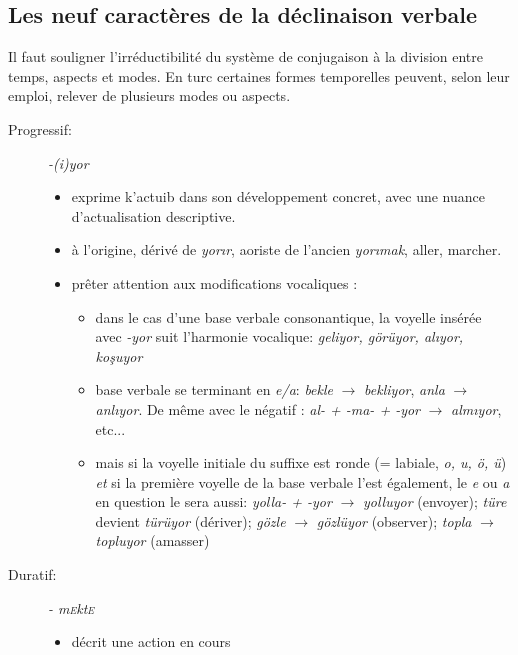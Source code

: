 \documentclass{cours}
\newcommand{\ch}{\c{s}}
\newcommand{\sce}{\textsc{e}}
\begin{document}
\subsection{Les neuf caractères de la déclinaison verbale}
Il faut souligner l'irréductibilité du système de conjugaison à la division entre temps, aspects et modes. En turc certaines formes temporelles peuvent, selon leur emploi, relever de plusieurs modes ou aspects.

\begin{description}
    \item[Progressif:] {\sl -(i)yor}
        \begin{itemize}
            \item exprime k'actuib dans son développement concret, avec une nuance d'actualisation descriptive.
            \item à l'origine, dérivé de \textsl{yor\i r}, aoriste de l'ancien \textsl{yor\i mak}, \og aller, marcher\fg.
            \item prêter attention aux modifications vocaliques :
                  \begin{itemize}[label = \textbullet]
                      \item dans le cas d'une base verbale consonantique, la voyelle insérée avec \textsl{-yor} suit l'harmonie vocalique: \textsl{geliyor, görüyor, al\i yor, ko\ch uyor}
                      \item base verbale se terminant en \textsl{e/a}: \textsl{bekle} $\to$ \textsl{bekliyor}, \textsl{anla} $\to$ \textsl{anl\i yor}. De même avec le négatif : \textsl{al- + -ma- + -yor} $\to$ \textsl{alm\i yor}, etc...
                      \item mais si la voyelle initiale du suffixe est \og ronde \fg (= labiale, \textsl{o, u, ö, ü}) \emph{et} si la première voyelle de la base verbale l'est également, le \textsl{e} ou {\sl a} en question le sera aussi: \textsl{yolla- + -yor} $\to$ \textsl{yolluyor} (envoyer); \textsl{türe} devient \textsl{türüyor} (dériver); \textsl{gözle} $\to$ \textsl{gözlüyor} (observer); \textsl{topla} $\to$ \textsl{topluyor} (amasser)
                  \end{itemize}
        \end{itemize}
    \item [Duratif:] {\sl - m\sce kt\sce}
          \begin{itemize}
              \item décrit une action en cours
          \end{itemize}

\end{description}
\end{document}
